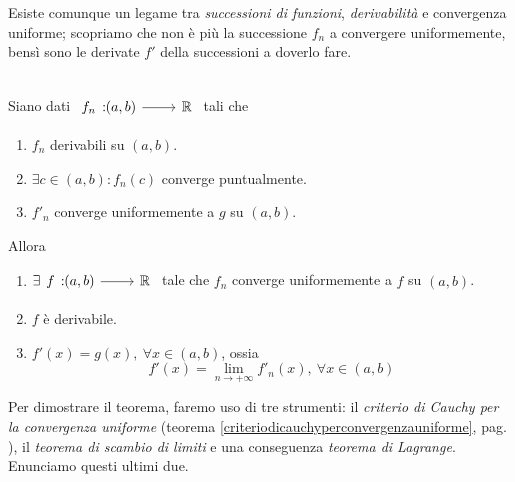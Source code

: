 Esiste comunque un legame tra \textit{successioni di funzioni}, \textit{derivabilità} e convergenza uniforme; scopriamo che non è più la successione $f_n$ a convergere uniformemente, bensì sono le derivate $f'$ della successioni a doverlo fare.
\begin{theorema}~{}\\
	Siano dati $\funz{f_n}{\left(a,b\right)}{\realset}$ tali che
	\begin{enumerate}
		\item $f_n$ derivabili su $\left(a,b\right)$.
		\item $\exists c\in\left(a,b\right)\colon f_n\left(c\right)$ converge puntualmente.
		\item $f'_n$ converge uniformemente a $g$ su $\left(a,b\right)$.
	\end{enumerate}
Allora
\begin{enumerate}
	\item $\exists\funz{f}{\left(a,b\right)}{\realset}$ tale che $f_n$ converge uniformemente a $f$ su $\left(a,b\right)$.
	\item $f$ è derivabile.
	\item $f'\left(x\right)=g\left(x\right),\ \forall x\in \left(a,b\right)$, ossia
	\begin{equation}
		f'\left(x\right)=\lim_{n\to+\infty}f'_n\left(x\right),\ \forall x\in\left(a,b\right)
	\end{equation}
\end{enumerate}
\end{theorema}
Per dimostrare il teorema, faremo uso di tre strumenti: il \textit{criterio di Cauchy per la convergenza uniforme} (teorema \ref{criteriodicauchyperconvergenzauniforme}, pag. \pageref{criteriodicauchyperconvergenzauniforme}), il \textit{teorema di scambio di limiti} e una conseguenza \textit{teorema di Lagrange}. Enunciamo questi ultimi due.
